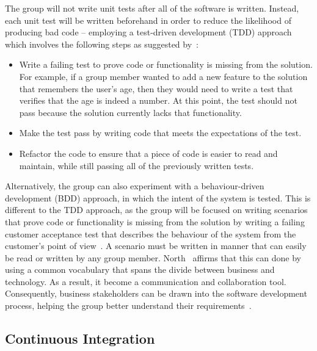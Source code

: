 The group will not write unit tests after all of the software is written. Instead, each unit test will be written beforehand in order to reduce the likelihood of producing bad code -- employing a test-driven development (TDD) approach which involves the following steps as suggested by~\textcite{book:art_of_unit_testing}:

\begin{itemize}
  \item Write a failing test to prove code or functionality is missing from the solution. For example, if a group member wanted to add a new feature to the solution that remembers the user’s age, then they would need to write a test that verifies that the age is indeed a number. At this point, the test should not pass because the solution currently lacks that functionality.
  \item Make the test pass by writing code that meets the expectations of the test.
  \item Refactor the code to ensure that a piece of code is easier to read and maintain, while still passing all of the previously written tests.
\end{itemize}

Alternatively, the group can also experiment with a behaviour-driven development (BDD) approach, in which the intent of the system is tested. This is different to the TDD approach, as the group will be focused on writing scenarios that prove code or functionality is missing from the solution by writing a failing customer acceptance test that describes the behaviour of the system from the customer's point of view~\parencite{book:art_of_unit_testing}. A scenario must be written in manner that can easily be read or written by any group member. North~\parencite{web:behaviour_driven_development} affirms that this can done by using a common vocabulary that spans the divide between business and technology. As a result, it become a communication and collaboration tool. Consequently, business stakeholders can be drawn into the software development process, helping the group better understand their requirements~\parencite{web:behaviour_driven_development}.

\subsection{Continuous Integration}

